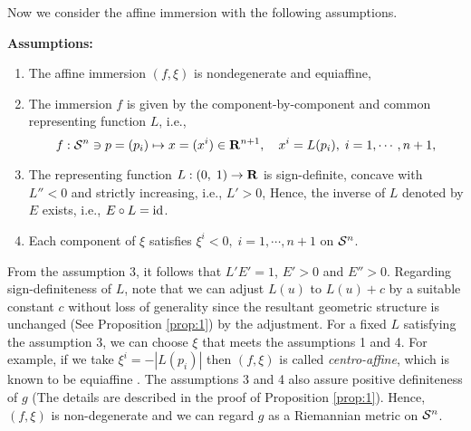 \documentclass{llncs}
\begin{document}
Now we consider the affine immersion with the following assumptions.

\noindent 
{\bf Assumptions:}
\begin{enumerate}
\item The affine immersion $(f, \xi)$ is nondegenerate and equiaffine,
\item The immersion $f$ is given by the component-by-component and common 
representing function $L$, i.e., 
\[
	f:{\cal S}^n \ni p= (p_i) \mapsto x=(x^i) \in {\bf R}^{n+1}, 
	\quad x^i=L(p_i), \; i=1,\cdots,n+1, 
\]
\item The representing function $L:(0,\;1) \rightarrow {\bf R}$ is 
sign-definite, concave with $L''<0$ and strictly increasing, i.e., $L' >0$,
Hence, the inverse of $L$ denoted by $E$ exists, i.e.,
$E \circ L ={\rm id}$.
\item Each component of $\xi$ satisfies $\xi^i <0, \; i=1,\cdots,n+1$ 
on ${\cal S}^n$.
\end{enumerate}

\begin{remark}
From the assumption 3, it follows that 
$ L' E' =1$, $E'>0$ and $E''>0$.
Regarding sign-definiteness of $L$, note that 
we can adjust $L(u)$ to $L(u)+c$ by 
a suitable constant $c$ without loss of generality 
since the resultant geometric structure is unchanged 
(See Proposition \ref{prop:1}) by the adjustment.
For a fixed $L$ satisfying the assumption 3, 
we can choose $\xi$ that meets the assumptions 1 and 4.
For example, if we take $\xi^i=-|L(p_i)|$ then 
$(f,\xi)$ is called {\em centro-affine}, 
which is known to be equiaffine \cite{NS}.
The assumptions 3 and 4 also assure positive definiteness of $g$
(The details are described in the proof of Proposition \ref{prop:1}).
Hence, $(f,\xi)$ is non-degenerate and  
we can regard $g$ as a Riemannian metric on ${\cal S}^n$.
\end{remark}
\end{document}
